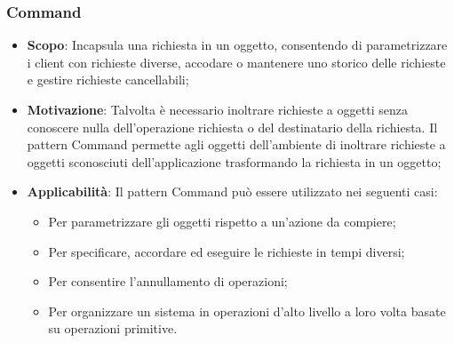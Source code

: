 		\subsubsection{Command}	
		\begin{itemize}
		\item \textbf{Scopo}: Incapsula una richiesta in un oggetto, consentendo di parametrizzare i
client con richieste diverse, accodare o mantenere uno storico delle richieste e gestire richieste cancellabili;
		\item \textbf{Motivazione}: Talvolta è necessario inoltrare richieste a oggetti senza conoscere
nulla dell’operazione richiesta o del destinatario della richiesta. Il pattern Command permette agli oggetti dell’ambiente di inoltrare richieste a oggetti sconosciuti dell’applicazione trasformando la richiesta in un oggetto;
		\item \textbf{Applicabilità}: Il pattern Command può essere utilizzato nei seguenti casi:
		\begin{itemize}
		\item Per parametrizzare gli oggetti rispetto a un’azione da compiere;
		\item Per specificare, accordare ed eseguire le richieste in tempi diversi;
		\item Per consentire l’annullamento di operazioni;
		\item Per organizzare un sistema in operazioni d’alto livello a loro volta basate su operazioni primitive.
		\end{itemize}

		\end{itemize}
		
	